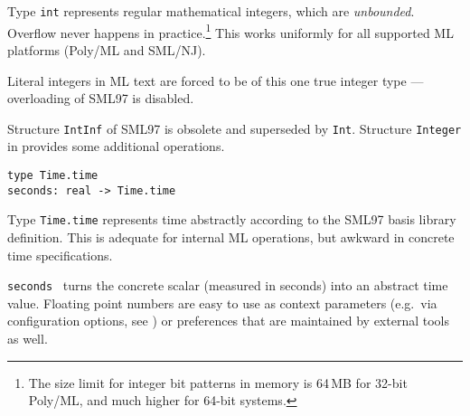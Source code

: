 \begin{isabellebody}
\begin{isamarkuptext}
  \begin{description}

  \item Type \verb|int| represents regular mathematical integers,
  which are \emph{unbounded}.  Overflow never happens in
  practice.\footnote{The size limit for integer bit patterns in memory
  is 64\,MB for 32-bit Poly/ML, and much higher for 64-bit systems.}
  This works uniformly for all supported ML platforms (Poly/ML and
  SML/NJ).

  Literal integers in ML text are forced to be of this one true
  integer type --- overloading of SML97 is disabled.

  Structure \verb|IntInf| of SML97 is obsolete and superseded by
  \verb|Int|.  Structure \verb|Integer| in \hyperlink{file.~~/src/Pure/General/integer.ML}{\mbox{}} provides some additional
  operations.

  \end{description}%
\end{isamarkuptext}%
\isamarkuptrue%
%
\endisatagmlref
{\isafoldmlref}%
%
\isadelimmlref
%
\endisadelimmlref
%
\isamarkuptrue%
%
\isadelimmlref
%
\endisadelimmlref
%
\isatagmlref
%
\begin{isamarkuptext}%
\begin{mldecls}
  \verb|type Time.time| \\
  \verb|seconds: real -> Time.time| \\
  \end{mldecls}

  \begin{description}

  \item Type \verb|Time.time| represents time abstractly according
  to the SML97 basis library definition.  This is adequate for
  internal ML operations, but awkward in concrete time specifications.

  \item \verb|seconds|~ turns the concrete scalar  (measured in seconds) into an abstract time value.  Floating
  point numbers are easy to use as context parameters (e.g.\ via
  configuration options, see ) or
  preferences that are maintained by external tools as well.


\end{description}
\end{isamarkuptext}
\end{isabellebody}

